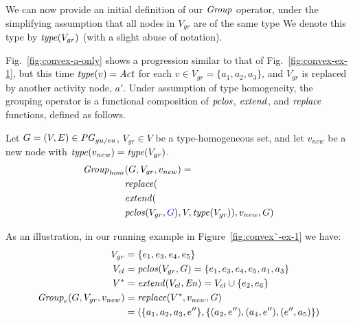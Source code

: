 We can now provide an initial definition of our $\mathit{Group}$ operator, under the simplifying assumption that all nodes in $V_{gr}$ are of the same type   We denote this type by $\mathit{type}(V_{gr})$ (with a slight abuse of notation). 

Fig.~\ref{fig:convex-a-only} shows a progression similar to that of Fig.~\ref{fig:convex-ex-1}, but this time $\mathit{type}(v) = \mathit{Act}$ for each $v \in V_{gr} = \{a_1, a_2, a_3\}$, and $V_{gr}$ is replaced by another activity node, $a'$.
%
Under assumption of type homogeneity, the grouping operator is a functional composition of $\mathit{pclos}$, $\mathit{extend}$, and $\mathit{replace}$ functions, defined as follows.

\vspace*{10pt}
\begin{definition}
Let $G=(V,E) \in \mathit{PG}_{gu/ea}$, $V_{gr} \in V$ be a type-homogeneous set, and let $v_{new}$ be a new node with $\mathit{type}(v_{new}) = \mathit{type}(V_{gr})$.
\begin{align*}
\group_{hom} &  (G, V_{gr}, v_{new}) = \\
 & \repl(  \\
 & \extend( \\
 & \clos(V_{gr},\jwb{G}), V, \type(V_{gr})), v_{new},  G ) 
\end{align*}
\label{def:homo-group}
\end{definition}

As an illustration, in our running example in Figure~\ref{fig:convex`-ex-1} we have: %
\begin{align*}
V_{gr} &= \{e_1, e_3, e_4, e_5\} \\
V_{cl} & = \mathit{pclos}(V_{gr},G) = \{e_1, e_3, e_4, e_5, a_1, a_3\} \\
V^{*} & = \mathit{extend}(V_{cl}, \mathit{En}) = V_{cl} \cup  \{e_2, e_6 \} \\
\mathit{Group}_e(G, V_{gr}, v_{new}) & = \mathit{replace}(V^{*}, v_{new}, G) \\
& = (\{a_1,a_2,a_3,e''\}, \{ (a_2, e''), (a_4, e''), (e'',a_5) \})
\end{align*}


%


